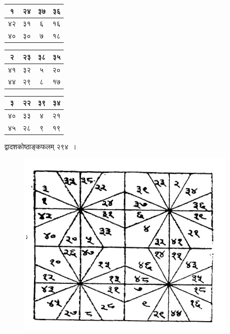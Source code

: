 \documentclass[11pt, openany]{book}
\begin{document}
\begin{table}[h]
\setlength{\extrarowheight}{2pt} \setlength{\tabcolsep}{2pt}	
\centering
\hspace{4mm} \begin{tabular}{|c|c|c|c|}
	\hline
	१ & २४ & ३७ & ३६\\
	\hline
	४२ & ३१ & ६ & १६\\
	\hline
	४०& ३० & ७ & १८\\
	\hline
\end{tabular} \hspace{2mm} 
\begin{tabular}{|c|c|c|c|}
	\hline
	२ & २३ & ३८ & ३५\\
	\hline
	४१ & ३२ & ५ & २०\\
	\hline
	४४ & २९ & ८ & १७\\
	\hline
\end{tabular} \hspace{2mm} 
\begin{tabular}{|c|c|c|c|}
	\hline
	३ & २२ & ३९ & ३४\\
	\hline
	४० & ३३ & ४ & २१\\
	\hline
	४५ & २८ & ९ & १९\\
	\hline
\end{tabular}
\end{table}
\vspace{-4mm}

\begin{center}
	द्वादशकोष्ठाङ्कफलम् २९४~।	
\end{center}
\vspace{-8mm}

\begin{figure}[h!]
    \centering
    \includegraphics[scale=0.4]{graphics/418.jpg}
    
\end{figure}
\vspace{-6mm}
\end{document}

